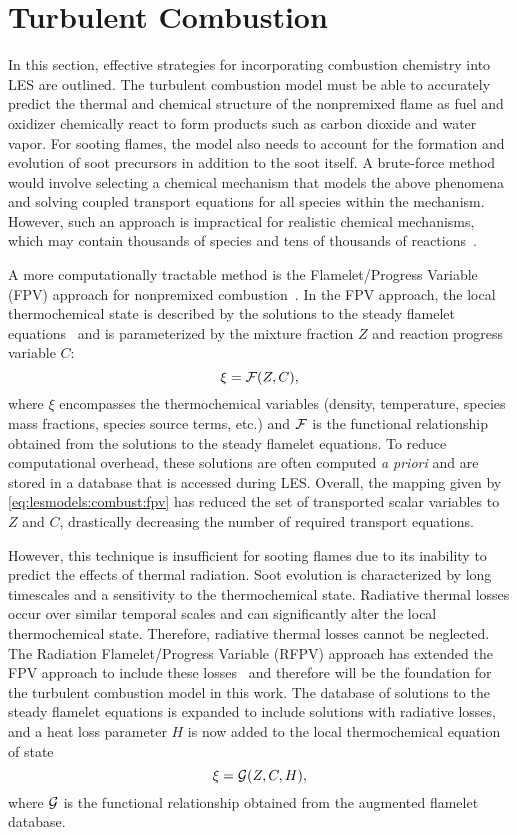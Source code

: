 \section{Turbulent Combustion}
\label{sec:lesmodels:combust}

In this section, effective strategies for incorporating combustion chemistry into LES are outlined. The turbulent combustion model must be able to accurately predict the thermal and chemical structure of the nonpremixed flame as fuel and oxidizer chemically react to form products such as carbon dioxide and water vapor. For sooting flames, the model also needs to account for the formation and evolution of soot precursors in addition to the soot itself. A brute-force method would involve selecting a chemical mechanism that models the above phenomena and solving coupled transport equations for all species within the mechanism. However, such an approach is impractical for realistic chemical mechanisms, which may contain thousands of species and tens of thousands of reactions~\cite{law2007}.

A more computationally tractable method is the Flamelet/Progress Variable (FPV) approach for nonpremixed combustion~\cite{pierce2004}. In the FPV approach, the local thermochemical state is described by the solutions to the steady flamelet equations~\cite{peters1984} and is parameterized by the mixture fraction $Z$ and reaction progress variable $C$:
\begin{equation}\label{eq:lesmodels:combust:fpv}
  \xi = \mathcal{F}(Z,C),
\end{equation}
where $\xi$ encompasses the thermochemical variables (density, temperature, species mass fractions, species source terms, etc.) and $\mathcal{F}$ is the functional relationship obtained from the solutions to the steady flamelet equations. To reduce computational overhead, these solutions are often computed \textit{a priori} and are stored in a database that is accessed during LES. Overall, the mapping given by \cref{eq:lesmodels:combust:fpv} has reduced the set of transported scalar variables to $Z$ and $C$, drastically decreasing the number of required transport equations.

However, this technique is insufficient for sooting flames due to its inability to predict the effects of thermal radiation. Soot evolution is characterized by long timescales and a sensitivity to the thermochemical state. Radiative thermal losses occur over similar temporal scales and can significantly alter the local thermochemical state. Therefore, radiative thermal losses cannot be neglected. The Radiation Flamelet/Progress Variable (RFPV) approach has extended the FPV approach to include these losses~\cite{ihme2008} and therefore will be the foundation for the turbulent combustion model in this work. The database of solutions to the steady flamelet equations is expanded to include solutions with radiative losses, and a heat loss parameter $H$ is now added to the local thermochemical equation of state
\begin{equation}\label{eq:lesmodels:combust:rfpv}
  \xi = \mathcal{G}(Z, C, H),
\end{equation}
where $\mathcal{G}$ is the functional relationship obtained from the augmented flamelet database.

